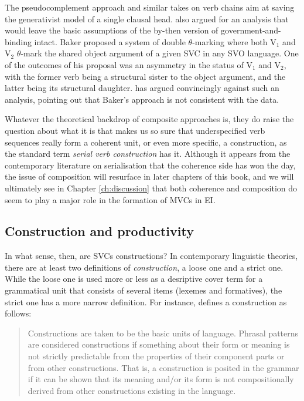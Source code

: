 The pseudocomplement approach and similar takes on verb chains aim at saving the generativist model of a single clausal head. \citet{baker1989object} also argued for an analysis that would leave the basic assumptions of the by-then version of government-and-binding intact. Baker proposed a system of double $\theta$-marking where both V$_1$ and V$_2$ $\theta$-mark the shared object argument of a given SVC in any SVO language. One of the outcomes of his proposal was an asymmetry in the status of V$_1$ and V$_2$, with the former verb being a structural sister to the object argument, and the latter being its structural daughter. \citet{Durie1997} has argued convincingly against such an analysis, pointing out that Baker's approach is not consistent with the data.

Whatever the theoretical backdrop of composite approaches is, they do raise the question about what it is that makes us so sure that underspecified verb sequences really form a coherent unit, or even more specific, a construction, as the standard term \textit{serial verb construction} has it. Although it appears from the contemporary literature on serialisation that the coherence side has won the day, the issue of composition will resurface in later chapters of this book, and we will ultimately see in Chapter \ref{ch:discussion} that both coherence and composition do seem to play a major role in the formation of MVCs in EI.

\subsection{Construction and productivity}\label{sec:construction}

In what sense, then, are SVCs constructions? In contemporary linguistic theories, there are at least two definitions of \textit{construction}, a loose one and a strict one. While the loose one is used more or less as a desriptive cover term for a grammatical unit that consists of several items (lexemes and formatives), the strict one has a more narrow definition. For instance, \citet[4]{goldberg1995constructions} defines a construction as follows: 

\begin{quote}Constructions are taken to be the basic units of language. Phrasal patterns are considered constructions if something about their form or meaning is not strictly predictable from the properties of their component parts or from other constructions. That is, a construction is posited in the grammar if it can be shown that its meaning and/or its form is not compositionally derived from other constructions existing in the language.\end{quote}

